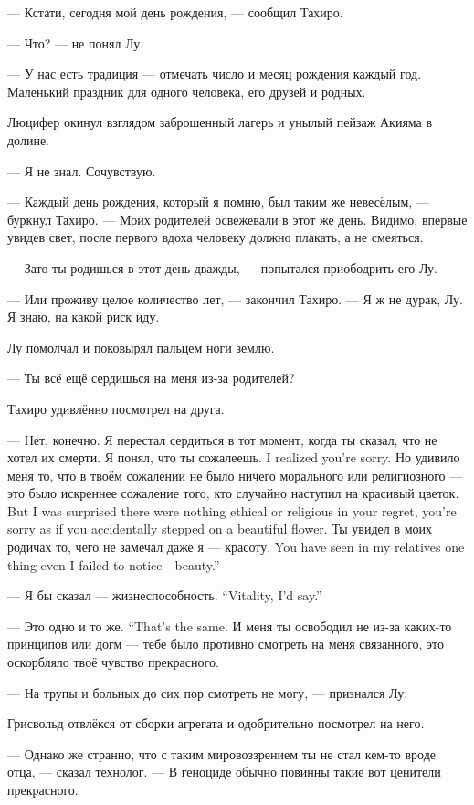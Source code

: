 --- Кстати, сегодня мой день рождения, --- сообщил Тахиро.

--- Что? --- не понял Лу.

--- У нас есть традиция --- отмечать число и месяц рождения каждый год.
Маленький праздник для одного человека, его друзей и родных.

Люцифер окинул взглядом заброшенный лагерь и унылый пейзаж Акияма в долине.

--- Я не знал.
Сочувствую.

--- Каждый день рождения, который я помню, был таким же невесёлым, --- буркнул Тахиро.
--- Моих родителей освежевали в этот же день.
Видимо, впервые увидев свет, после первого вдоха человеку должно плакать, а не смеяться.

--- Зато ты родишься в этот день дважды, --- попытался приободрить его Лу.

--- Или проживу целое количество лет, --- закончил Тахиро.
--- Я ж не дурак, Лу.
Я знаю, на какой риск иду.

Лу помолчал и поковырял пальцем ноги землю.

--- Ты всё ещё сердишься на меня из-за родителей?

Тахиро удивлённо посмотрел на друга.

--- Нет, конечно.
Я перестал сердиться в тот момент, когда ты сказал, что не хотел их смерти.
{Я понял, что ты сожалеешь.}
{I realized you're sorry.}
{Но удивило меня то, что в твоём сожалении не было ничего морального или религиозного --- это было искреннее сожаление того, кто случайно наступил на красивый цветок.}
{But I was surprised there were nothing ethical or religious in your regret, you're sorry as if you accidentally stepped on a beautiful flower.}
{Ты увидел в моих родичах то, чего не замечал даже я --- красоту.}
{You have seen in my relatives one thing even I failed to notice---beauty.''}

{--- Я бы сказал --- жизнеспособность.}
{``Vitality, I'd say.''}

{--- Это одно и то же.}
{``That's the same.}
И меня ты освободил не из-за каких-то принципов или догм --- тебе было противно смотреть на меня связанного, это оскорбляло твоё чувство прекрасного.

--- На трупы и больных до сих пор смотреть не могу, --- признался Лу.

Грисвольд отвлёкся от сборки агрегата и одобрительно посмотрел на него.

--- Однако же странно, что с таким мировоззрением ты не стал кем-то вроде отца, --- сказал технолог.
--- В геноциде обычно повинны такие вот ценители прекрасного.

